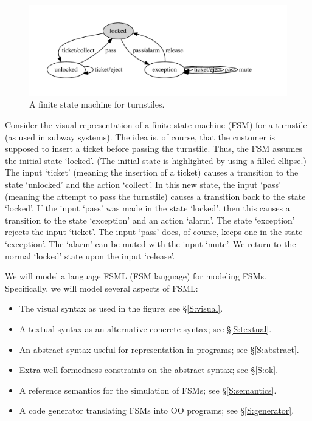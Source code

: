 \documentclass[preprint,authoryear,12pt]{noelsarticle}
\begin{document}

\begin{figure}[t!]
\vspace{-77\in}
\includegraphics[width=\textwidth]{../../languages/fsml/dot/sample.pdf}
\vspace{-150\in}
\caption{A finite state machine for turnstiles.}
\label{F:turnstile}
\end{figure}


Consider the visual representation of a finite state machine (FSM) for
a turnstile (as used in subway systems). The idea is, of course, that
the customer is supposed to insert a ticket before passing the
turnstile. Thus, the FSM assumes the initial state `locked'. (The
initial state is highlighted by using a filled ellipse.) The input
`ticket' (meaning the insertion of a ticket) causes a transition to
the state `unlocked' and the action `collect'. In this new state, the
input `pass' (meaning the attempt to pass the turnstile) causes a
transition back to the state `locked'. If the input `pass' was made in
the state `locked', then this causes a transition to the state
`exception' and an action `alarm'. The state `exception' rejects the
input `ticket'. The input `pass' does, of course, keeps one in the
state `exception'. The `alarm' can be muted with the input `mute'. We
return to the normal `locked' state upon the input `release'.

We will model a language FSML (FSM language) for modeling
FSMs. Specifically, we will model several aspects of FSML:

\begin{itemize}
\item The visual syntax as used in the figure; see \S\ref{S:visual}.
\item A textual syntax as an alternative concrete syntax; see \S\ref{S:textual}.
\item An abstract syntax useful for representation in programs; see \S\ref{S:abstract}.
\item Extra well-formedness constraints on the abstract syntax; see \S\ref{S:ok}.
\item A reference semantics for the simulation of FSMs; see \S\ref{S:semantics}.
\item A code generator translating FSMs into OO programs; see \S\ref{S:generator}.
\end{itemize}
\end{document}

